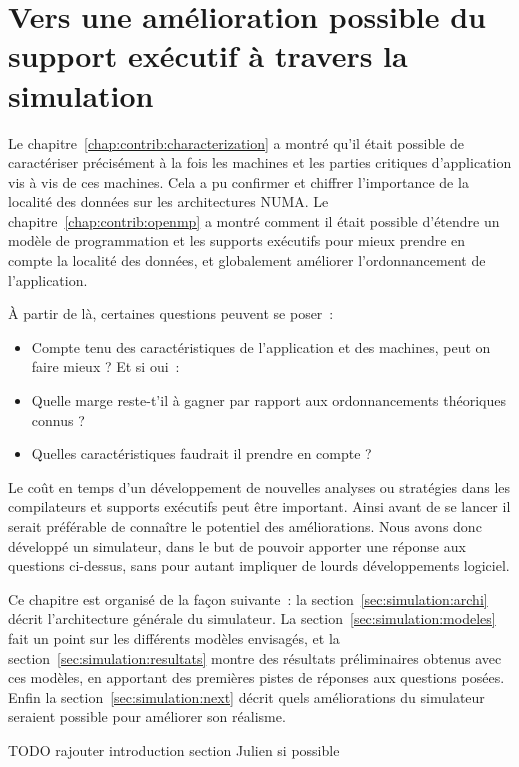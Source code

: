 \chapter{Vers une amélioration possible du support exécutif à travers la simulation}\label{chap:simulation}
\chaptertoc

Le chapitre~\ref{chap:contrib:characterization} a montré qu'il était possible de caractériser précisément à la fois les machines et les parties critiques d'application vis à vis de ces machines.
Cela a pu confirmer et chiffrer l'importance de la localité des données sur les architectures NUMA.
Le chapitre~\ref{chap:contrib:openmp} a montré comment il était possible d'étendre un modèle de programmation et les supports exécutifs pour mieux prendre en compte la localité des données, et globalement améliorer l'ordonnancement de l'application.

À partir de là, certaines questions peuvent se poser~:
\begin{itemize}
  \item Compte tenu des caractéristiques de l'application et des machines, peut on faire mieux ? Et si oui~:
  \item Quelle marge reste-t'il à gagner par rapport aux ordonnancements théoriques connus ?
  \item Quelles caractéristiques faudrait il prendre en compte ?
\end{itemize}

Le coût en temps d'un développement de nouvelles analyses ou stratégies dans les compilateurs et supports exécutifs peut être important. Ainsi avant de se lancer il serait préférable de connaître le potentiel des améliorations.
Nous avons donc développé un simulateur, dans le but de pouvoir apporter une réponse aux questions ci-dessus, sans pour autant impliquer de lourds développements logiciel.

Ce chapitre est organisé de la façon suivante~: la section~\ref{sec:simulation:archi} décrit l'architecture générale du simulateur.
La section~\ref{sec:simulation:modeles} fait un point sur les différents modèles envisagés, et la section~\ref{sec:simulation:resultats} montre des résultats préliminaires obtenus avec ces modèles, en apportant des premières pistes de réponses aux questions posées.
Enfin la section~\ref{sec:simulation:next} décrit quels améliorations du simulateur seraient possible pour améliorer son réalisme.

\begin{todo}
TODO rajouter introduction section Julien si possible
\end{todo}


